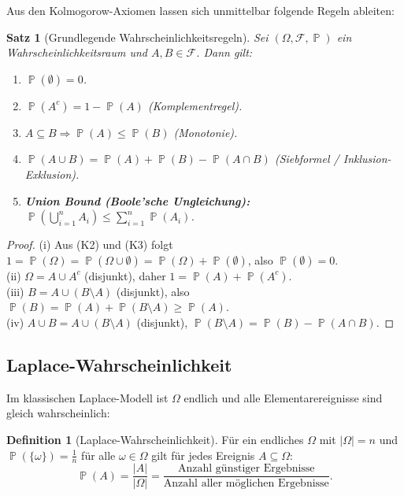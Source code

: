 ﻿\documentclass[12pt,a4paper]{article}
\theoremstyle{definition}
\newtheorem{definition}{Definition}[section]
\theoremstyle{plain}
\newtheorem{satz}{Satz}[section]
\theoremstyle{remark}
\DeclareMathOperator{\Prob}{\mathbb{P}}
\begin{document}
Aus den Kolmogorow-Axiomen lassen sich unmittelbar folgende Regeln ableiten:

\begin{satz}[Grundlegende Wahrscheinlichkeitsregeln]\label{satz:grundregeln}
  Sei $(\Omega, \mathcal{F}, \Prob)$ ein Wahrscheinlichkeitsraum und
  $A, B \in \mathcal{F}$. Dann gilt:
  \begin{enumerate}[label=(\roman*)]
    \item $\Prob(\emptyset) = 0$.
    \item $\Prob(A^c) = 1 - \Prob(A)$ \quad (Komplementregel).
    \item $A \subseteq B \Rightarrow \Prob(A) \leq \Prob(B)$ \quad (Monotonie).
    \item $\Prob(A \cup B) = \Prob(A) + \Prob(B) - \Prob(A \cap B)$ \quad
      (Siebformel / Inklusion-Exklusion).
    \item \textbf{Union Bound (Boole'sche Ungleichung):}
      $\Prob\!\left(\bigcup_{i=1}^{n} A_i\right) \leq \sum_{i=1}^{n} \Prob(A_i)$.
  \end{enumerate}
\end{satz}

\begin{proof}
  (i) Aus (K2) und (K3) folgt
  $1 = \Prob(\Omega) = \Prob(\Omega \cup \emptyset) = \Prob(\Omega) + \Prob(\emptyset)$,
  also $\Prob(\emptyset)=0$.\\
  (ii) $\Omega = A \cup A^c$ (disjunkt), daher $1 = \Prob(A) + \Prob(A^c)$.\\
  (iii) $B = A \cup (B \setminus A)$ (disjunkt), also $\Prob(B) = \Prob(A) + \Prob(B\setminus A) \geq \Prob(A)$.\\
  (iv) $A \cup B = A \cup (B \setminus A)$ (disjunkt), $\Prob(B\setminus A) = \Prob(B) - \Prob(A \cap B)$.
\end{proof}

\subsection{Laplace-Wahrscheinlichkeit}

Im klassischen Laplace-Modell ist $\Omega$ endlich und alle Elementarereignisse
sind gleich wahrscheinlich:

\begin{definition}[Laplace-Wahrscheinlichkeit]\label{def:laplace}
  Für ein endliches $\Omega$ mit $|\Omega| = n$ und
  $\Prob(\{\omega\}) = \frac{1}{n}$ für alle $\omega \in \Omega$ gilt für
  jedes Ereignis $A \subseteq \Omega$:
  \[
    \Prob(A) = \frac{|A|}{|\Omega|} = \frac{\text{Anzahl günstiger Ergebnisse}}
    {\text{Anzahl aller möglichen Ergebnisse}}.
  \]
\end{definition}
\end{document}
